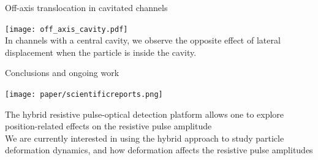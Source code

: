 

\begin{frame}[c]{Off-axis translocation in cavitated channels}
	
	{\centering
		\texttt{[image: off\_axis\_cavity.pdf]} \\
		{\scriptsize \textcolor{negativered}{In channels with a central cavity, we observe the opposite effect of lateral displacement when the particle is inside the cavity.} } \\
		\par
	}
	
\end{frame}






\begin{frame}[c]{Conclusions and ongoing work}


	{\centering
		\texttt{[image: paper/scientificreports.png]} \\
		\par
	}
	
	\vspace{.4in}
	{\small
		The hybrid resistive pulse-optical detection platform allows one to explore position-related effects on the resistive pulse amplitude \\
		\vspace{.1in}
		We are currently interested in using the hybrid approach to study particle deformation dynamics, and how deformation affects the resistive pulse amplitudes \\
	}

	
\end{frame}



